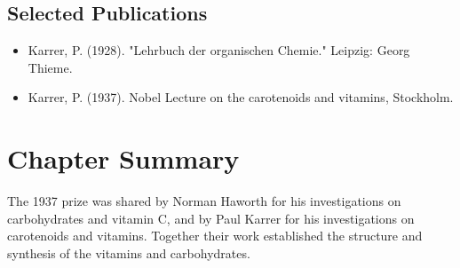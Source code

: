 \subsection*{Selected Publications}

\begin{itemize}

\item Karrer, P. (1928). "Lehrbuch der organischen Chemie." Leipzig: Georg Thieme.

\item Karrer, P. (1937). Nobel Lecture on the carotenoids and vitamins, Stockholm.

\end{itemize}

\clearpage

\section*{Chapter Summary}

The 1937 prize was shared by Norman Haworth for his investigations on carbohydrates and vitamin C, and by Paul Karrer for his investigations on carotenoids and vitamins. Together their work established the structure and synthesis of the vitamins and carbohydrates.
